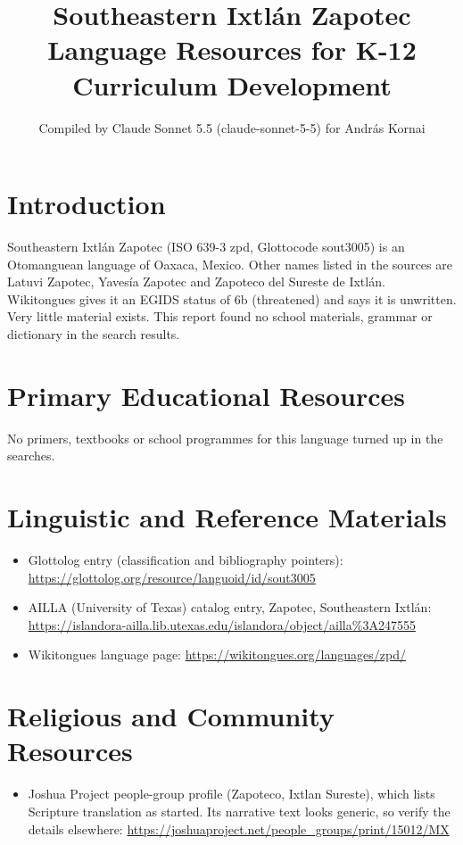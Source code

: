 \documentclass[12pt]{article}
\title{Southeastern Ixtl\'an Zapotec Language Resources for K-12 Curriculum Development}
\author{Compiled by Claude Sonnet 5.5 (claude-sonnet-5-5) for Andr\'as Kornai}
\date{}
\begin{document}
\maketitle

\section{Introduction}
Southeastern Ixtl\'an Zapotec (ISO 639-3 zpd, Glottocode sout3005) is an Otomanguean language of Oaxaca, Mexico. Other names listed in the sources are Latuvi Zapotec, Yaves\'ia Zapotec and Zapoteco del Sureste de Ixtl\'an. Wikitongues gives it an EGIDS status of 6b (threatened) and says it is unwritten. Very little material exists. This report found no school materials, grammar or dictionary in the search results.

\section{Primary Educational Resources}
No primers, textbooks or school programmes for this language turned up in the searches.

\section{Linguistic and Reference Materials}
\begin{itemize}
\item Glottolog entry (classification and bibliography pointers): \url{https://glottolog.org/resource/languoid/id/sout3005}
\item AILLA (University of Texas) catalog entry, Zapotec, Southeastern Ixtl\'an: \url{https://islandora-ailla.lib.utexas.edu/islandora/object/ailla%3A247555}
\item Wikitongues language page: \url{https://wikitongues.org/languages/zpd/}
\end{itemize}

\section{Religious and Community Resources}
\begin{itemize}
\item Joshua Project people-group profile (Zapoteco, Ixtlan Sureste), which lists Scripture translation as started. Its narrative text looks generic, so verify the details elsewhere: \url{https://joshuaproject.net/people_groups/print/15012/MX}
\end{itemize}
\end{document}
